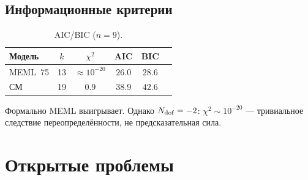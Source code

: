 \documentclass[12pt,a4paper]{article}
\numberwithin{equation}{section}
\begin{document}
\subsection{Информационные критерии}

\begin{table}[H]
\centering
\caption{AIC/BIC ($n=9$).}
\begin{tabular}{lccccc}
\toprule
Модель & $k$ & $\chi^2$ & AIC & BIC \\
\midrule
MEML~75 & 13 & $\approx 10^{-20}$ & $26.0$ & $28.6$ \\
СМ       & 19 & $0.9$              & $38.9$ & $42.6$ \\
\bottomrule
\end{tabular}
\end{table}

Формально MEML выигрывает. Однако $N_{\rm dof} = -2$:
$\chi^2 \sim 10^{-20}$ --- тривиальное следствие
переопределённости, не предсказательная сила.

\section{Открытые проблемы}
\end{document}
